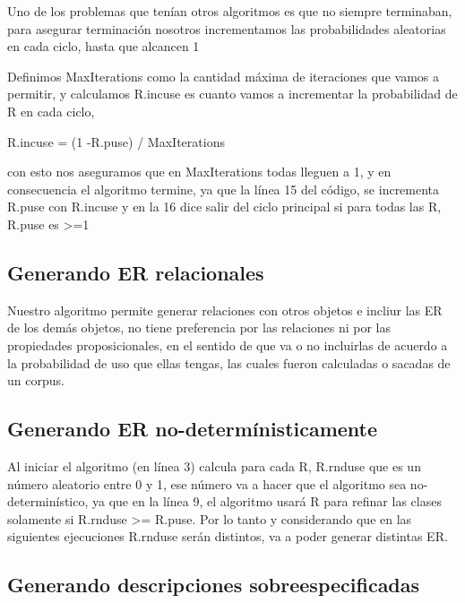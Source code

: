 Uno de los problemas que ten\'ian otros algoritmos es que no siempre terminaban, para asegurar terminaci\'on nosotros incrementamos las probabilidades aleatorias en cada ciclo, hasta que alcancen 1

Definimos MaxIterations como la cantidad m\'axima de iteraciones que vamos a permitir, y calculamos R.incuse es cuanto vamos a incrementar la probabilidad de R en cada ciclo, 

R.incuse = (1 -R.puse) / MaxIterations

con esto nos aseguramos que en MaxIterations todas lleguen a 1, y en consecuencia el algoritmo termine, ya que la l\'inea 15 del c\'odigo, se incrementa R.puse con R.incuse y en la 16 dice salir del ciclo principal si para todas las R, R.puse es >=1

\subsection{Generando ER relacionales}

Nuestro algoritmo permite generar relaciones con otros objetos e incliur las ER de los dem\'as objetos, no tiene preferencia por las relaciones ni por las propiedades proposicionales, en el sentido de que va o no incluirlas de acuerdo a la probabilidad de uso que ellas tengas, las cuales fueron calculadas o sacadas de un corpus.

\subsection{Generando ER no-determ\'inisticamente}

Al iniciar el algoritmo (en l\'inea 3) calcula para cada R, R.rnduse que es un n\'umero aleatorio entre 0 y 1, ese n\'umero va a hacer que el algoritmo sea no-determin\'istico, ya que en la l\'inea 9, el algoritmo usar\'a R para refinar las clases solamente si 
R.rnduse >= R.puse. Por lo tanto y considerando que en las siguientes ejecuciones R.rnduse ser\'an distintos, va a poder generar distintas ER.

\subsection{Generando descripciones sobreespecificadas}\label{sec:overspecification}

